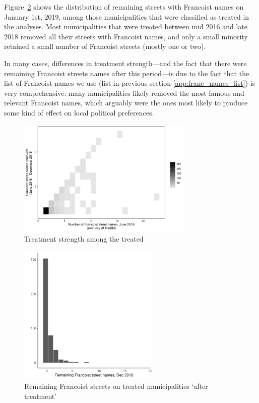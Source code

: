 \documentclass[12pt, titlepage]{article}
\begin{document}
Figure~\ref{fig:trt_remaining} shows the distribution of remaining streets with Francoist names on January 1st, 2019, among those municipalities that were classified as treated in the analyses.
Most municipalities that were treated between mid 2016 and late 2018 removed all their streets with Francoist names, and only a small minority retained a small number of Francoist streets (mostly one or two).

In many cases, differences in treatment strength---and the fact that there were remaining Francoist streets names after this period---is due to the fact that the list of Francoist names we use (list in previous section \ref{app:franc_names_list}) is very comprehensive: many municipalities likely removed the most famous and relevant Francoist names, which arguably were the ones most likely to produce some kind of effect on local political preferences.

\begin{figure}[htb!]
\centering

  \includegraphics[width = 0.75\textwidth]{img/trt_strength_st2016}

  \caption{Treatment strength among the treated}\label{fig:trt_strength_st2016}

\end{figure}

\begin{figure}[htb!]
\centering

  \includegraphics[width = 0.6\textwidth]{img/trt_remaining}

  \caption{Remaining Francoist streets on treated municipalities `after treatment'}\label{fig:trt_remaining}

\end{figure}
\end{document}
